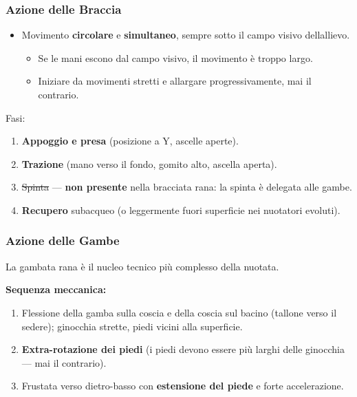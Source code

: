 \documentclass[a4paper,11pt]{article}
\providecommand{\tightlist}{%
  \setlength{\itemsep}{0pt}\setlength{\parskip}{0pt}}
\begin{document}
\subsubsection{Azione delle Braccia}\label{azione-delle-braccia-2}

\begin{itemize}
      \tightlist
      \item
            Movimento \textbf{circolare} e \textbf{simultaneo}, sempre sotto il
            campo visivo dell\textquotesingle allievo.

            \begin{itemize}
                  \tightlist
                  \item
                        Se le mani escono dal campo visivo, il movimento è troppo largo.
                  \item
                        Iniziare da movimenti stretti e allargare progressivamente, mai il
                        contrario.
            \end{itemize}
\end{itemize}

Fasi:

\begin{enumerate}
      \tightlist
      \item
            \textbf{Appoggio e presa} (posizione a Y, ascelle aperte).
      \item
            \textbf{Trazione} (mano verso il fondo, gomito alto, ascella aperta).
      \item
            \sout{Spinta} --- \textbf{non presente} nella bracciata rana: la spinta
            è delegata alle gambe.
      \item
            \textbf{Recupero} subacqueo (o leggermente fuori superficie nei
            nuotatori evoluti).
\end{enumerate}

\subsubsection{Azione delle Gambe}\label{azione-delle-gambe}

La gambata rana è il nucleo tecnico più complesso della nuotata.

\textbf{Sequenza meccanica:}

\begin{enumerate}
      \tightlist
      \item
            Flessione della gamba sulla coscia e della coscia sul bacino (tallone
            verso il sedere); ginocchia strette, piedi vicini alla superficie.
      \item
            \textbf{Extra-rotazione dei piedi} (i piedi devono essere più larghi
            delle ginocchia --- mai il contrario).
      \item
            Frustata verso dietro-basso con \textbf{estensione del piede} e forte
            accelerazione.
\end{enumerate}
\end{document}
